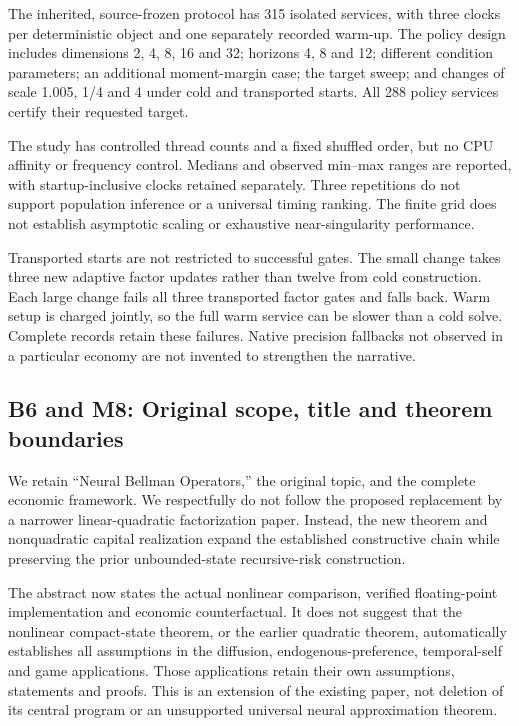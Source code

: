 \documentclass[
  11pt,
]{article}
\begin{document}
The inherited, source-frozen protocol has 315 isolated services, with
three clocks per deterministic object and one separately recorded
warm-up. The policy design includes dimensions 2, 4, 8, 16 and 32;
horizons 4, 8 and 12; different condition parameters; an additional
moment-margin case; the target sweep; and changes of scale 1.005, 1/4
and 4 under cold and transported starts. All 288 policy services certify
their requested target.

The study has controlled thread counts and a fixed shuffled order, but
no CPU affinity or frequency control. Medians and observed min--max
ranges are reported, with startup-inclusive clocks retained separately.
Three repetitions do not support population inference or a universal
timing ranking. The finite grid does not establish asymptotic scaling or
exhaustive near-singularity performance.

Transported starts are not restricted to successful gates. The small
change takes three new adaptive factor updates rather than twelve from
cold construction. Each large change fails all three transported factor
gates and falls back. Warm setup is charged jointly, so the full warm
service can be slower than a cold solve. Complete records retain these
failures. Native precision fallbacks not observed in a particular
economy are not invented to strengthen the narrative.

\hypertarget{b6-and-m8-original-scope-title-and-theorem-boundaries}{%
\subsection{B6 and M8: Original scope, title and theorem
boundaries}\label{b6-and-m8-original-scope-title-and-theorem-boundaries}}

We retain ``Neural Bellman Operators,'' the original topic, and the
complete economic framework. We respectfully do not follow the proposed
replacement by a narrower linear-quadratic factorization paper. Instead,
the new theorem and nonquadratic capital realization expand the
established constructive chain while preserving the prior
unbounded-state recursive-risk construction.

The abstract now states the actual nonlinear comparison, verified
floating-point implementation and economic counterfactual. It does not
suggest that the nonlinear compact-state theorem, or the earlier
quadratic theorem, automatically establishes all assumptions in the
diffusion, endogenous-preference, temporal-self and game applications.
Those applications retain their own assumptions, statements and proofs.
This is an extension of the existing paper, not deletion of its central
program or an unsupported universal neural approximation theorem.
\end{document}
